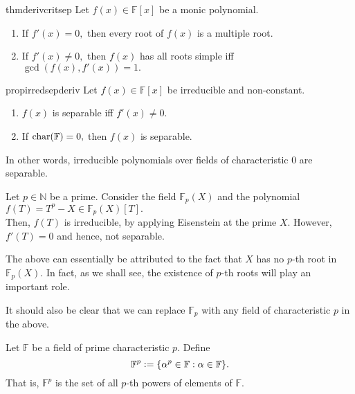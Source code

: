 \begin{restatable}{thm}{derivcritsep}
\label{thm:derivcritsep}
    Let $f(x) \in \mathbb{F}[x]$ be a monic polynomial.
    \begin{enumerate}
         \item If $f'(x) = 0,$ then every root of $f(x)$ is a multiple root.
         \item If $f'(x) \neq 0,$ then $f(x)$ has all roots simple iff $\gcd(f(x), f'(x)) = 1.$ \hfill\hyperref[thm:derivcritsep2]{\downsym}
     \end{enumerate} 
\end{restatable}

\begin{restatable}[]{prop}{irredsepderiv}
\label{prop:irredsepderiv}
    Let $f(x) \in \mathbb{F}[x]$ be irreducible and non-constant.
    \begin{enumerate}
         \item $f(x)$ is separable iff $f'(x) \neq 0.$
         \item If $\operatorname{char}(\mathbb{F}) = 0,$ then $f(x)$ is separable. 
     \end{enumerate} 
     In other words, irreducible polynomials over fields of characteristic $0$ are separable. \hfill\hyperref[prop:irredsepderiv2]{\downsym}
\end{restatable}

\begin{ex} \label{ex:FXnotperfect}
    Let $p \in \mathbb{N}$ be a prime. Consider the field $\mathbb{F}_p(X)$ and the polynomial $f(T) = T^p - X \in \mathbb{F}_p(X)[T].$ \\
    Then, $f(T)$ is irreducible, by applying Eisenstein at the prime $X.$ However, $f'(T) = 0$ and hence, not separable.

    The above can essentially be attributed to the fact that $X$ has no $p$-th root in $\mathbb{F}_p(X).$ In fact, as we shall see, the existence of $p$-th roots will play an important role.

    It should also be clear that we can replace $\mathbb{F}_p$ with any field of characteristic $p$ in the above.
\end{ex}

\begin{defn}%
    Let $\mathbb{F}$ be a field of prime characteristic $p.$ Define
    \begin{equation*} 
        \mathbb{F}^p \vcentcolon= \{\alpha^p \in \mathbb{F} : \alpha \in \mathbb{F}\}.
    \end{equation*}
    That is, $\mathbb{F}^p$ is the set of all $p$-th powers of elements of $\mathbb{F}.$
\end{defn}

